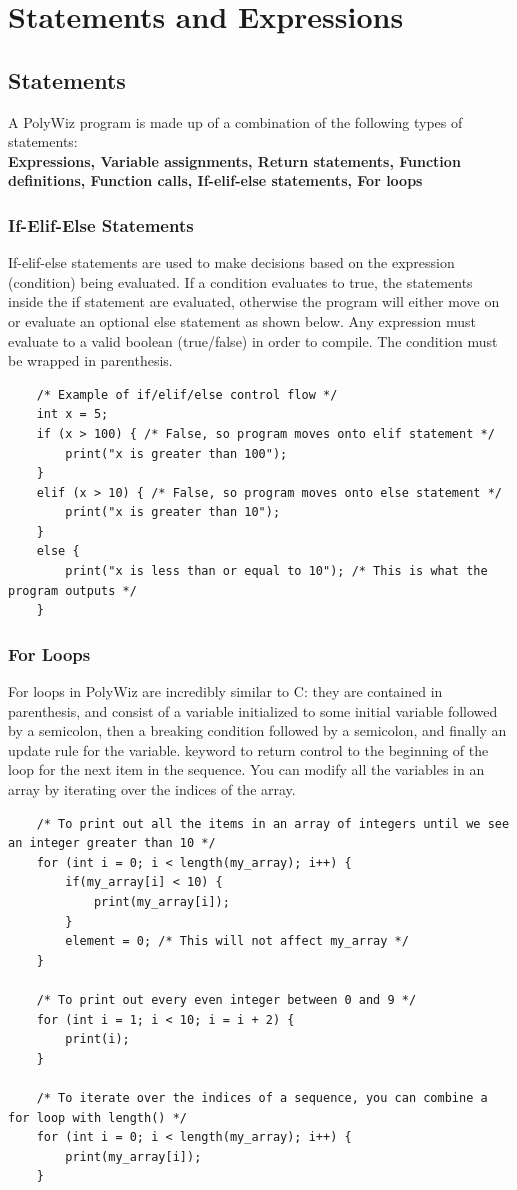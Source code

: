 \documentclass{article}
\begin{document}
\section{Statements and Expressions}
\subsection{Statements}
 A PolyWiz program is made up of a combination of the following types of statements: \\
    \textbf{Expressions, Variable assignments, Return statements, Function definitions, Function calls, If-elif-else statements, For loops} 
\subsubsection{If-Elif-Else Statements}
If-elif-else statements are used to make decisions based on the expression (condition) being evaluated. If a condition evaluates to true, the statements inside the if statement are evaluated, otherwise the program will either move on or evaluate an optional else statement as shown below. Any expression must evaluate to a valid boolean (true/false) in order to compile. The condition must be wrapped in parenthesis.
\begin{lstlisting}
    /* Example of if/elif/else control flow */
    int x = 5;
    if (x > 100) { /* False, so program moves onto elif statement */
        print("x is greater than 100");
    }
    elif (x > 10) { /* False, so program moves onto else statement */
        print("x is greater than 10");
    }
    else {
        print("x is less than or equal to 10"); /* This is what the program outputs */
    }
    \end{lstlisting}
\subsubsection{For Loops}
 For loops in PolyWiz are incredibly similar to C: they are contained in parenthesis, and consist of a variable initialized to some initial variable followed by a semicolon, then a breaking condition followed by a semicolon, and finally an update rule for the variable. keyword to return control to the beginning of the loop for the next item in the sequence. You can modify all the variables in an array by iterating over the indices of the array.
    \begin{lstlisting}
    /* To print out all the items in an array of integers until we see an integer greater than 10 */
    for (int i = 0; i < length(my_array); i++) {
        if(my_array[i] < 10) {
            print(my_array[i]);
        }
        element = 0; /* This will not affect my_array */
    } 
    
    /* To print out every even integer between 0 and 9 */
    for (int i = 1; i < 10; i = i + 2) {
        print(i);
    }
    
    /* To iterate over the indices of a sequence, you can combine a for loop with length() */
    for (int i = 0; i < length(my_array); i++) { 
        print(my_array[i]);
    }
    \end{lstlisting}
\end{document}
